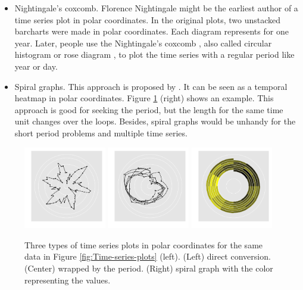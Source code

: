 \documentclass[12pt]{article}
\begin{document}
\begin{enumerate}
\begin{itemize}
\item Nightingale's coxcomb. Florence Nightingale might be the earliest
author of a time series plot in polar coordinates. In the original
plots, two unstacked barcharts were made in polar coordinates. Each
diagram represents for one year. Later, people use the Nightingale's
coxcomb \citep{nightingale1858notes}, also called circular histogram
or rose diagram \citep{nemec1988shape}, to plot the time series with
a regular period like year or day.
\item Spiral graphs. This approach is proposed by \citet{weber2001visualizing}.
It can be seen as a temporal heatmap in polar coordinates. Figure 
\ref{fig:polar-axis} (right) shows an example. This approach
is good for seeking the period, but the length for the same time unit
changes over the loops. Besides, spiral graphs would be unhandy for
the short period problems and multiple time series.
\end{itemize}

\begin{center}
\begin{figure}[H]
\begin{centering}
\includegraphics[width=0.32\textwidth]{graph/pipeline-03-polarline}
\includegraphics[width=0.32\textwidth]{graph/pipeline-03-polarperiod}
\includegraphics[width=0.32\textwidth]{graph/pipeline-03-spiral}
\par\end{centering}
\caption{\label{fig:polar-axis}Three types of time series plots
in polar coordinates for the same data in Figure
\ref{fig:Time-series-plots} (left).
(Left) direct conversion. (Center) wrapped by the period.
(Right) spiral graph with the color representing the values.}
\end{figure}
\par\end{center}


\end{enumerate}
\end{document}
